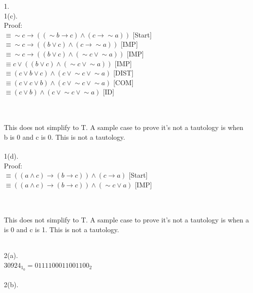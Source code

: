 \documentclass[a4paper, 20pt]{article}
\def\lnot{\mathop{\sim}}
\begin{document}
\begin{question}{1.}
\\ 1(c).
\\ Proof:
\\ $\equiv \lnot c \rightarrow ((\lnot b \rightarrow c)\land (c \rightarrow \lnot a))$ [Start]
\\ $\equiv \lnot c \rightarrow (( b \lor c)\land (c \rightarrow \lnot a))$ [IMP]
\\ $\equiv \lnot c \rightarrow (( b \lor c)\land (\lnot c \lor \lnot a))$ [IMP]
\\ $\equiv c \lor (( b \lor c)\land (\lnot c \lor \lnot a))$ [IMP]
\\ $\equiv (c \lor b \lor c)\land (c \lor \lnot c \lor \lnot a)$ [DIST]
\\ $\equiv (c \lor c \lor b)\land (c \lor \lnot c \lor \lnot a)$ [COM]
\\ $\equiv (c \lor b)\land (c \lor \lnot c \lor \lnot a)$ [ID]

\\\boxed{}
\\ This does not simplify to T. A sample case to prove it's not a tautology is when b is 0 and c is 0. This is not a tautology.
\\
\\ 1(d).
\\ Proof:
\\ $\equiv ((a \land c) \rightarrow (b \rightarrow c)) \land (c \rightarrow a)$ [Start]
\\ $\equiv ((a \land c) \rightarrow (b \rightarrow c)) \land (\lnot c \lor a)$ [IMP]

\\ \boxed{}
\\ This does not simplify to T. A sample case to prove it's not a tautology is when a is 0 and c is 1. This is not a tautology.
\\
\newpage

\newpage
\\ 2(a).
\\ $30924_1_0 = 0111 1000 1100 1100_2$
\\
\\ 2(b).

\end{question}
\end{document}
